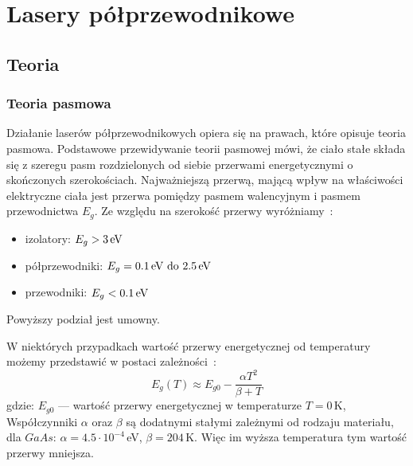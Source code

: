 \chapter{Lasery półprzewodnikowe}
\section{Teoria}
\subsection{Teoria pasmowa}
Działanie laserów półprzewodnikowych opiera się na prawach, które opisuje teoria pasmowa.
Podstawowe przewidywanie teorii pasmowej mówi, że ciało stałe składa się z szeregu pasm rozdzielonych od siebie
przerwami energetycznymi o skończonych szerokościach. Najważniejszą przerwą, mającą wpływ na właściwości elektryczne ciała jest
przerwa pomiędzy pasmem walencyjnym i pasmem przewodnictwa $E_g$. Ze względu na szerokość przerwy
wyróżniamy~\cite{laser_book}:
\begin{itemize}
\item izolatory: $E_g > 3 \text{\,eV}$
\item półprzewodniki: $E_g = 0.1 \text{\,eV do } 2.5\text{\,eV} $
\item przewodniki: $E_g<0.1\text{\,eV}$
\end{itemize}
Powyższy podział jest umowny.

W niektórych przypadkach wartość przerwy energetycznej od temperatury możemy przedstawić w postaci zależności~\cite{laser_book}:
\begin{equation}
E_g(T) \approx E_{g0} - \frac{\alpha T^2}{\beta + T}
\end{equation}
gdzie: $E_{g0}$ --- wartość przerwy energetycznej w temperaturze $T=0$\,K,
Współczynniki $\alpha$ oraz $\beta$ są dodatnymi stałymi zależnymi od rodzaju materiału,
dla $GaAs$: $\alpha = 4.5 \cdot 10^{-4}$\,eV, $\beta = 204$\,K.
Więc im wyższa temperatura tym wartość przerwy mniejsza.
